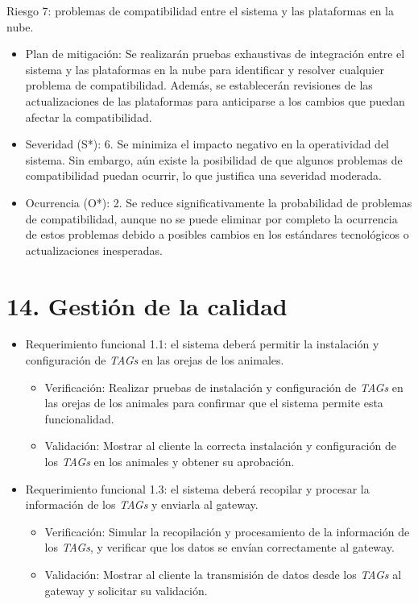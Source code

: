 \documentclass[
11pt, %
]{charter}
\begin{document}
Riesgo 7: problemas de compatibilidad entre el sistema y las plataformas en la nube.
\begin{itemize}
    \item Plan de mitigación: Se realizarán pruebas exhaustivas de integración entre el sistema y las plataformas en la nube para identificar y resolver cualquier problema de compatibilidad. Además, se establecerán revisiones de las actualizaciones de las plataformas para anticiparse a los cambios que puedan afectar la compatibilidad. 
	\item Severidad (S*): 6. Se minimiza el impacto negativo en la operatividad del sistema. Sin embargo, aún existe la posibilidad de que algunos problemas de compatibilidad puedan ocurrir, lo que justifica una severidad moderada.
	\item Ocurrencia (O*): 2. Se reduce significativamente la probabilidad de problemas de compatibilidad, aunque no se puede eliminar por completo la ocurrencia de estos problemas debido a posibles cambios en los estándares tecnológicos o actualizaciones inesperadas.
\end{itemize}


\section{14. Gestión de la calidad}
\label{sec:calidad}

\begin{itemize}
\item Requerimiento funcional 1.1: el sistema deberá permitir la instalación y configuración de \emph{TAGs} en las orejas de
los animales.
\begin{itemize}
\item Verificación: Realizar pruebas de instalación y configuración de \emph{TAGs} en las orejas de los animales para confirmar que el sistema permite esta funcionalidad.
\item Validación: Mostrar al cliente la correcta instalación y configuración de los \emph{TAGs} en los animales y obtener su aprobación.
\end{itemize}
\end{itemize}

\begin{itemize}
\item Requerimiento funcional 1.3: el sistema deberá recopilar y procesar la información de los \emph{TAGs} y enviarla al
gateway.
\begin{itemize}
\item Verificación: Simular la recopilación y procesamiento de la información de los \emph{TAGs}, y verificar que los datos se envían correctamente al gateway.
\item Validación: Mostrar al cliente la transmisión de datos desde los \emph{TAGs} al gateway y solicitar su validación.
\end{itemize}
\end{itemize}
\end{document}
